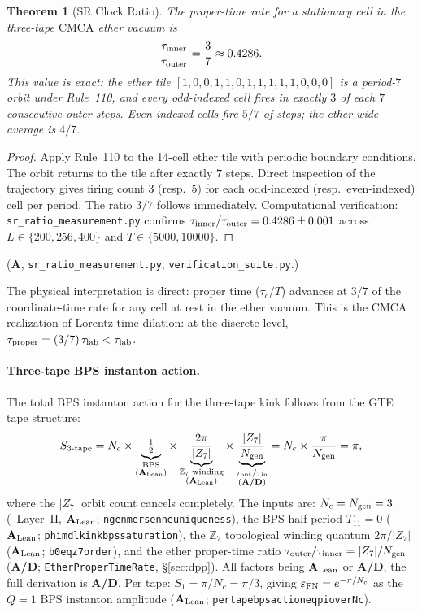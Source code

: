 \documentclass[11pt]{article}
\newtheorem{theorem}{Theorem}[section]
\theoremstyle{remark}
\newcommand{\PSC}{\text{PSC}}
\newcommand{\ZS}{\mathbb{Z}_7}
\newcommand{\lean}[1]{%
  \penalty-100
  \begingroup\def\_{\textunderscore\allowbreak}\texttt{#1}\endgroup}
\newcommand{\Ngen}{N_{\rm gen}}
\newcommand{\CatA}{\textbf{A}}
\newcommand{\CatAL}{\ensuremath{\textbf{A}_{\rm Lean}}}
\newcommand{\CatAD}{\textbf{A/D}}
\newcommand{\CMCA}{\text{CMCA}}
\newcommand{\tauc}{\tau_c}
\newcommand{\taucratio}{\tau_{\rm inner}/\tau_{\rm outer}}
\begin{document}
\begin{theorem}[SR Clock Ratio]
\label{thm:clock-ratio}
The proper-time rate for a stationary cell in the three-tape $\CMCA$ ether
vacuum is
\[
  \frac{\tau_{\rm inner}}{\tau_{\rm outer}} = \frac{3}{7} \approx 0.4286.
\]
This value is exact: the ether tile $[1,0,0,1,1,0,1,1,1,1,1,0,0,0]$ is a
period-$7$ orbit under Rule~110, and every odd-indexed cell fires in exactly
$3$ of each $7$ consecutive outer steps.  Even-indexed cells fire $5/7$ of
steps; the ether-wide average is $4/7$.
\end{theorem}
\begin{proof}
Apply Rule~110 to the 14-cell ether tile with periodic boundary conditions.
The orbit returns to the tile after exactly $7$ steps.  Direct inspection of
the trajectory gives firing count $3$ (resp.\ $5$) for each odd-indexed
(resp.\ even-indexed) cell per period.  The ratio $3/7$ follows immediately.
Computational verification: \texttt{sr\_ratio\_measurement.py} confirms
$\taucratio = 0.4286 \pm 0.001$ across $L \in \{200, 256, 400\}$ and
$T \in \{5000, 10000\}$.
\end{proof}
($\CatA$, \texttt{sr\_ratio\_measurement.py}, \texttt{verification\_suite.py}.)

The physical interpretation is direct: proper time ($\tauc/T$) advances at
$3/7$ of the coordinate-time rate for any cell at rest in the ether vacuum.
This is the $\CMCA$ realization of Lorentz time dilation: at the discrete
level, $\tau_{\rm proper} = (3/7)\,\tau_{\rm lab} < \tau_{\rm lab}$.

\paragraph{Three-tape BPS instanton action.}
The total BPS instanton action for the three-tape kink follows from the GTE
tape structure:
\begin{equation}\label{eq:S_3tape}
S_{3\text{-tape}}
  = N_c \times
    \underbrace{\tfrac{1}{2}}_{\substack{\text{BPS}\\(\CatAL)}}
  \times
    \underbrace{\dfrac{2\pi}{|Z_7|}}_{\substack{\ZS\text{ winding}\\(\CatAL)}}
  \times
    \underbrace{\dfrac{|Z_7|}{\Ngen}}_{\substack{\tau_{\rm out}/\tau_{\rm in}\\(\CatAD)}}
  = N_c \times \frac{\pi}{\Ngen} = \pi,
\end{equation}
where the $|Z_7|$ orbit count cancels completely.
The inputs are:
$N_c = \Ngen = 3$ (\PSC\ Layer~II, \CatAL;
\lean{ngen\_3\_mersenne\_uniqueness}),
the BPS half-period $T_{11} = 0$ (\CatAL;
\lean{phi\_mdl\_kink\_bps\_saturation}),
the $\ZS$ topological winding quantum $2\pi/|Z_7|$ (\CatAL;
\lean{b0\_eq\_z7\_order}),
and the ether proper-time ratio
$\tau_{\rm outer}/\tau_{\rm inner} = |Z_7|/\Ngen$ (\CatAD;
\lean{EtherProperTimeRate}, \S\ref{sec:dpp}).
All factors being \CatAL{} or \CatAD{}, the full derivation is \CatAD.
Per tape: $S_1 = \pi/N_c = \pi/3$, giving $\varepsilon_{\rm FN} = e^{-\pi/N_c}$
as the $Q=1$ BPS instanton amplitude
(\CatAL; \lean{per\_tape\_bps\_action\allowbreak\_eq\_pi\_over\_Nc}).
\end{document}
